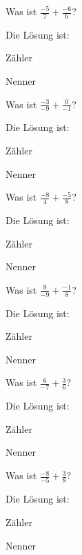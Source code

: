 \documentclass{ximera}
\begin{document}
\begin{shuffle}
\begin{question}
Was ist $\frac{-5}{7} + \frac{-6}{6}$?
\begin{solution}
Die Lösung ist:

Zähler 

Nenner 
\end{solution}
\end{question}


\begin{question}
Was ist $\frac{-3}{-9} + \frac{0}{-1}$?
\begin{solution}
Die Lösung ist:

Zähler 

Nenner 
\end{solution}
\end{question}


\begin{question}
Was ist $\frac{-8}{4} + \frac{-5}{8}$?
\begin{solution}
Die Lösung ist:

Zähler 

Nenner 
\end{solution}
\end{question}


\begin{question}
Was ist $\frac{9}{-9} + \frac{-1}{8}$?
\begin{solution}
Die Lösung ist:

Zähler 

Nenner 
\end{solution}
\end{question}


\begin{question}
Was ist $\frac{6}{-7} + \frac{3}{6}$?
\begin{solution}
Die Lösung ist:

Zähler 

Nenner 
\end{solution}
\end{question}


\begin{question}
Was ist $\frac{-8}{-5} + \frac{3}{8}$?
\begin{solution}
Die Lösung ist:

Zähler 

Nenner 
\end{solution}
\end{question}



\end{shuffle}
\end{document}
